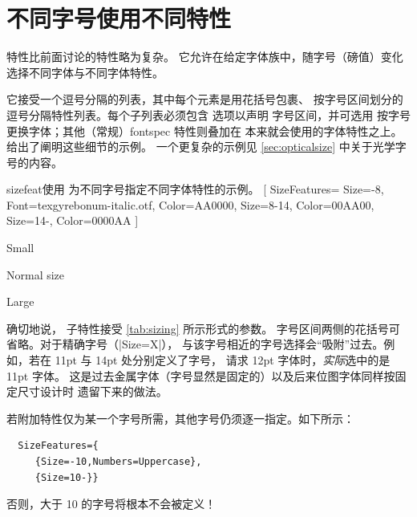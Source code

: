 \documentclass[a4paper]{l3doc}
\begin{document}
\section{不同字号使用不同特性}
\label{sec:sizefeature}


 特性比前面讨论的特性略为复杂。
它允许在给定字体族中，随字号（磅值）变化选择不同字体与不同字体特性。

它接受一个逗号分隔的列表，其中每个元素是用花括号包裹、
按字号区间划分的逗号分隔特性列表。每个子列表必须包含  选项以声明
字号区间，并可选用  按字号更换字体；其他（常规）fontspec 特性则叠加在
本来就会使用的字体特性之上。 给出了阐明这些细节的示例。
一个更复杂的示例见 \vref{sec:opticalsize} 中关于光学字号的内容。

\begin{Xexample}{sizefeat}{使用  为不同字号指定不同字体特性的示例。}
  [
    SizeFeatures={
      {Size={-8}, Font=texgyrebonum-italic.otf, Color=AA0000},
      {Size={8-14}, Color=00AA00},
      {Size={14-}, Color=0000AA}} ]

  {\scriptsize Small\par} Normal size\par {\Large Large\par}
\end{Xexample}

确切地说， 子特性接受 \vref{tab:sizing} 所示形式的参数。
字号区间两侧的花括号可省略。对于精确字号（|Size=X|），
与该字号相近的字号选择会“吸附”过去。例如，若在 11pt 与 14pt 处分别定义了字号，
请求 12pt 字体时，\emph{实际}选中的是 11pt 字体。
这是过去金属字体（字号显然是固定的）以及后来位图字体同样按固定尺寸设计时
遗留下来的做法。

若附加特性仅为某一个字号所需，其他字号仍须逐一指定。如下所示：
\begin{Verbatim}
  SizeFeatures={
     {Size=-10,Numbers=Uppercase},
     {Size=10-}}
\end{Verbatim}
否则，大于 10 的字号将根本不会被定义！
\end{document}

